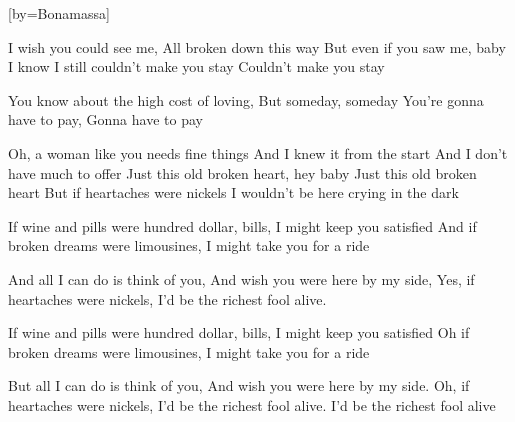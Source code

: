 

[by=Bonamassa]


\beginverse
I wish you could see me, All broken down this way
But even if you saw me, baby
I know I still couldn't make you stay
Couldn't make you stay
\endverse

\beginverse
You know about the high cost of loving, But someday, someday
You're gonna have to pay, Gonna have to pay
\endverse

\beginverse
Oh, a woman like you needs fine things
And I knew it from the start
And I don't have much to offer
Just this old broken heart, hey baby
Just this old broken heart
But if heartaches were nickels
I wouldn't be here crying in the dark
\endverse

\beginverse
If wine and pills were hundred dollar, bills, I might keep you satisfied
And if broken dreams were limousines, I might take you for a ride
\endverse

\beginverse
And all I can do is think of you, And wish you were here by my side,
Yes, if heartaches were nickels, I'd be the richest fool alive.
\endverse

\beginverse
If wine and pills were hundred dollar, bills, I might keep you satisfied
Oh if broken dreams were limousines, I might take you for a ride
\endverse

\beginverse
But all I can do is think of you, And wish you were here by my side.
Oh, if heartaches were nickels, I'd be the richest fool alive. 
I'd be the richest fool alive
\endverse




\chordson
\endsong
